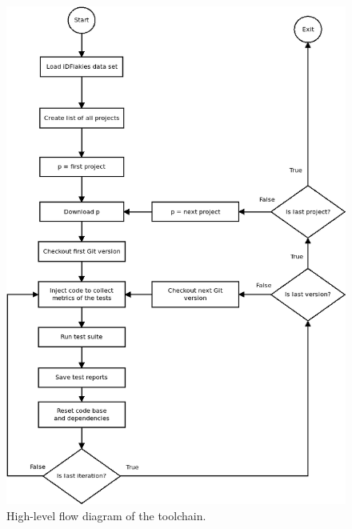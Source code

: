 \documentclass{seal_thesis}
\begin{document}
\begin{figure}
  \centering
  \includegraphics[scale=0.5]{images/toolchain_flow}
  \caption{High-level flow diagram of the toolchain.}
  \label{fig:toolchain}
\end{figure}
\end{document}
